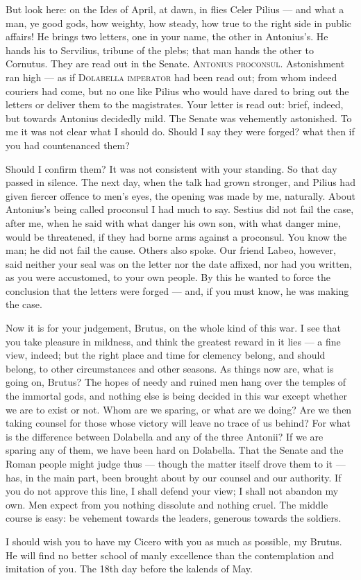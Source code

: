  But look here: on the Ides of April, at dawn, in flies Celer Pilius --- and what a man, ye good gods, how weighty, how steady, how true to the right side in public affairs! He brings two letters, one in your name, the other in Antonius's. He hands his to Servilius, tribune of the plebs; that man hands the other to Cornutus. They are read out in the Senate. \textsc{Antonius proconsul.} Astonishment ran high --- as if \textsc{Dolabella imperator} had been read out; from whom indeed couriers had come, but no one like Pilius who would have dared to bring out the letters or deliver them to the magistrates. Your letter is read out: brief, indeed, but towards Antonius decidedly mild. The Senate was vehemently astonished. To me it was not clear what I should do. Should I say they were forged? what then if you had countenanced them?

 Should I confirm them? It was not consistent with your standing. So that day passed in silence. The next day, when the talk had grown stronger, and Pilius had given fiercer offence to men's eyes, the opening was made by me, naturally. About Antonius's being called proconsul I had much to say. Sestius did not fail the case, after me, when he said with what danger his own son, with what danger mine, would be threatened, if they had borne arms against a proconsul. You know the man; he did not fail the cause. Others also spoke. Our friend Labeo, however, said neither your seal was on the letter nor the date affixed, nor had you written, as you were accustomed, to your own people. By this he wanted to force the conclusion that the letters were forged --- and, if you must know, he was making the case.

 Now it is for your judgement, Brutus, on the whole kind of this war. I see that you take pleasure in mildness, and think the greatest reward in it lies --- a fine view, indeed; but the right place and time for clemency belong, and should belong, to other circumstances and other seasons. As things now are, what is going on, Brutus? The hopes of needy and ruined men hang over the temples of the immortal gods, and nothing else is being decided in this war except whether we are to exist or not. Whom are we sparing, or what are we doing? Are we then taking counsel for those whose victory will leave no trace of us behind? For what is the difference between Dolabella and any of the three Antonii? If we are sparing any of them, we have been hard on Dolabella. That the Senate and the Roman people might judge thus --- though the matter itself drove them to it --- has, in the main part, been brought about by our counsel and our authority. If you do not approve this line, I shall defend your view; I shall not abandon my own. Men expect from you nothing dissolute and nothing cruel. The middle course is easy: be vehement towards the leaders, generous towards the soldiers.

 I should wish you to have my Cicero with you as much as possible, my Brutus. He will find no better school of manly excellence than the contemplation and imitation of you. The 18th day before the kalends of May.
